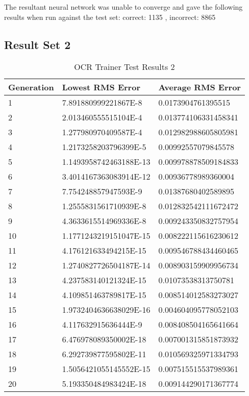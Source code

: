 The resultant neural network was unable to converge and gave the
following results when run against the test set:
correct:  1135 , incorrect:  8865

\subsection{Result Set 2}

\begin{center}
    \begin{longtable}{ | l | l | l |}
      \caption{OCR Trainer Test Results 2} \label{ocr2} \\
    \hline
  Generation & Lowest RMS Error & Average RMS Error \\ \hline
1 &	7.891880999221867E-8 &	0.0173904761395515 \\ \hline
2 &	2.013460555515104E-4 &	0.013774106331458341 \\ \hline
3 &	1.277980970409587E-4 &	0.012982988605805981 \\ \hline
4 &	1.2173258203796399E-5 &	0.00992557079845578 \\ \hline
5 &	1.1493958742463188E-13 &	0.009978878509184833 \\ \hline
6 &	3.4014167363083914E-12 &	0.00936778989360004 \\ \hline
7 &	7.754248857947593E-9 &	0.01387680402589895 \\ \hline
8 &	1.2555831561710939E-8 &	0.012832542111672472 \\ \hline
9 &	4.3633615514969336E-8 &	0.009243350832757954 \\ \hline
10 &	1.1771243219151047E-15 &	0.008222115616230612 \\ \hline
11 &	4.176121633494215E-15 &	0.009546788434460465 \\ \hline
12 &	1.2740827726504187E-14 &	0.008903159909956734 \\ \hline
13 &	4.237583140121324E-15 &	0.01073538313750781 \\ \hline
14 &	4.109851463789817E-15 &	0.008514012583273027 \\ \hline
15 &	1.9732404636638029E-16 &	0.004604095778052103 \\ \hline
16 &	4.117632915636444E-9 &	0.008408504165641664 \\ \hline
17 &	6.476978089350002E-18 &	0.007001315851873932 \\ \hline
18 &	6.292739877595802E-11 &	0.010569325971334793 \\ \hline
19 &	1.5056421055145552E-15 &	0.007515515537989361 \\ \hline
20 &	5.193350484983424E-18 &	0.009144290171367774 \\ \hline
\end{longtable}
\end{center}

